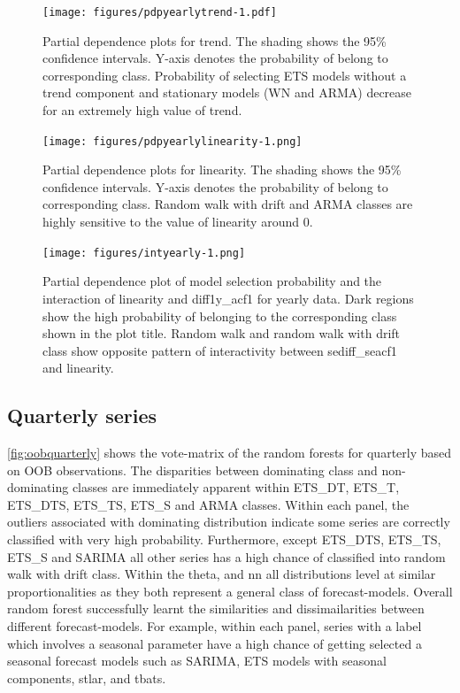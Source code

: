 \documentclass[11pt,a4paper,]{article}
\begin{document}
\begin{figure}
\centering
\texttt{[image: figures/pdpyearlytrend-1.pdf]}
\caption{\label{fig:pdpyearlytrend}Partial dependence plots for trend. The shading shows the 95\% confidence intervals. Y-axis denotes the probability of belong to corresponding class. Probability of selecting ETS models without a trend component and stationary models (WN and ARMA) decrease for an extremely high value of trend.}
\end{figure}

\begin{figure}
\centering
\texttt{[image: figures/pdpyearlylinearity-1.png]}
\caption{\label{fig:pdpyearlylinearity}Partial dependence plots for linearity. The shading shows the 95\% confidence intervals. Y-axis denotes the probability of belong to corresponding class. Random walk with drift and ARMA classes are highly sensitive to the value of linearity around 0.}
\end{figure}

\begin{figure}
\centering
\texttt{[image: figures/intyearly-1.png]}
\caption{\label{fig:intyearly}Partial dependence plot of model selection probability and the interaction of linearity and diff1y\_acf1 for yearly data. Dark regions show the high probability of belonging to the corresponding class shown in the plot title. Random walk and random walk with drift class show opposite pattern of interactivity between sediff\_seacf1 and linearity.}
\end{figure}

\hypertarget{quarterly-series}{%
\subsection{Quarterly series}\label{quarterly-series}}

\autoref{fig:oobquarterly} shows the vote-matrix of the random forests for quarterly based on OOB observations. The disparities between dominating class and non-dominating classes are immediately apparent within ETS\_DT, ETS\_T, ETS\_DTS, ETS\_TS, ETS\_S and ARMA classes. Within each panel, the outliers associated with dominating distribution indicate some series are correctly classified with very high probability. Furthermore, except ETS\_DTS, ETS\_TS, ETS\_S and SARIMA all other series has a high chance of classified into random walk with drift class. Within the theta, and nn all distributions level at similar proportionalities as they both represent a general class of forecast-models. Overall random forest successfully learnt the similarities and dissimailarities between different forecast-models. For example, within each panel, series with a label which involves a seasonal parameter have a high chance of getting selected a seasonal forecast models such as SARIMA, ETS models with seasonal components, stlar, and tbats.
\end{document}
